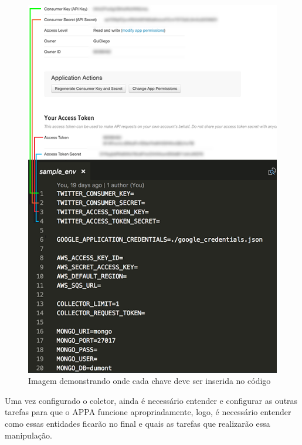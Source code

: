 \begin{figure}
    \centering
    \includegraphics[width=.8\textwidth]{imagens/twitteropts.png}
    \caption{Imagem demonstrando onde cada chave deve ser inserida no código}
    \label{fig:twitteropts}
\end{figure}

Uma vez configurado o coletor, ainda é necessário entender e configurar as outras tarefas para que o APPA funcione apropriadamente, logo, é necessário entender como essas entidades ficarão no final e quais as tarefas que realizarão essa manipulação.
